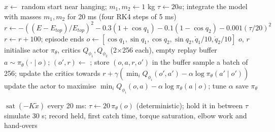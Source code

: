 \begin{algorithm}[H]
\caption{Learned swing-up: environment step and SAC training (\texttt{acrobot\_env.py}, \texttt{train.py})}
\label{alg:p5train}
\begin{algorithmic}[1]
  \State $x\gets$ random start near hanging; \quad $m_1,m_2\gets1$ kg 
\EndFunction
{}
  \State $\tau\gets20a$; \quad integrate the model with masses $m_1,m_2$ for 20 ms (four RK4 steps of 5 ms)
  \State $r\gets-((E-E_{top})/E_{top})^2-0.3(1+\cos q_1)-0.1(1-\cos q_2)-0.001(\tau/20)^2$
   \State $r\gets r+100$; episode ends 
  \EndIf
  \State $o\gets[\cos q_1,\sin q_1,\cos q_2,\sin q_2,\dot q_1/10,\dot q_2/10]$ 
  \State \Return $o$, $r$
\EndFunction
\State initialise actor $\pi_\theta$, critics $Q_{\phi_1},Q_{\phi_2}$ (2$\times$256 each), empty replay buffer
  \State $a\sim\pi_\theta(\cdot\mid o)$; \quad $(o',r)\gets$ ; \quad store $(o,a,r,o')$ in the buffer
  \State sample a batch of 256; update the critics towards $r+\gamma(\min_iQ_{\phi_i}(o',a')-\alpha\log\pi_\theta(a'\mid o'))$
  \State update the actor to maximise $\min_iQ_{\phi_i}(o,a)-\alpha\log\pi_\theta(a\mid o)$; tune $\alpha$
\EndFor
\State save $\pi_\theta$
\end{algorithmic}
\end{algorithm}
\begin{algorithm}[H]
\caption{Learned swing-up: RL $\to$ LQR controller and evaluation (\texttt{acrobot\_env.py}, \texttt{evaluate.py})}
\label{alg:p5eval}
\begin{algorithmic}[1]
   \State \Return $\operatorname{sat}(-K\tilde x)$ 
  \EndIf
  \State every 20 ms: $\tau\gets20\,\pi_\theta(o)$ (deterministic); hold it in between
  \State \Return $\tau$
\EndFunction
{} 
    \State simulate 30 s; record held, first catch time, torque saturation, elbow work and hand-overs
  \EndFor
\EndFor
\end{algorithmic}
\end{algorithm}
